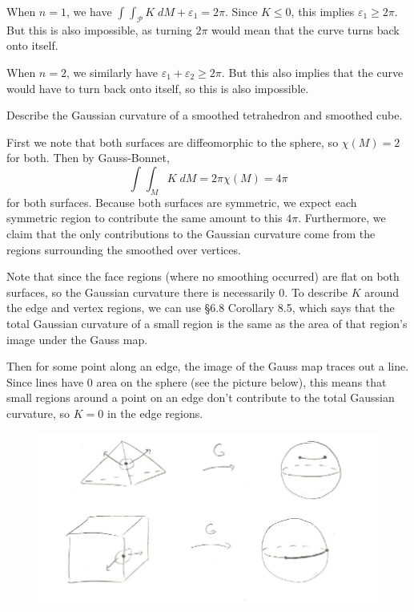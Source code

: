 \documentclass[10pt]{report}
\begin{document}
When $n=1$, we have $\int_{} \int_{\mathscr{P}} K\;dM + \varepsilon_1=2\pi$. Since $K \leq 0$, this implies $\varepsilon_1 \geq 2\pi$. But this is also impossible, as turning $2\pi$ would mean that the curve turns back onto itself.

When $n=2$, we similarly have $\varepsilon_1 + \varepsilon_2 \geq 2\pi$. But this also implies that the curve would have to turn back onto itself, so this is also impossible.

\pagebreak
\begin{exer}[]
Describe the Gaussian curvature of a smoothed tetrahedron and smoothed cube.
\end{exer}
First we note that both surfaces are diffeomorphic to the sphere, so $\chi(M)=2$ for both. Then by Gauss-Bonnet,
\[
	\int_{} \int_{M} K\;dM = 2\pi\chi(M) = 4\pi
\] for both surfaces. Because both surfaces are symmetric, we expect each symmetric region to contribute the same amount to this $4\pi$. Furthermore, we claim that the only contributions to the Gaussian curvature come from the regions surrounding the smoothed over vertices.

Note that since the face regions (where no smoothing occurred) are flat on both surfaces, so the Gaussian curvature there is necessarily 0. To describe $K$ around the edge and vertex regions, we can use \S 6.8 Corollary 8.5, which says that the total Gaussian curvature of a small region is the same as the area of that region's image under the Gauss map.

Then for some point along an edge, the image of the Gauss map traces out a line. Since lines have 0 area on the sphere (see the picture below), this means that small regions around a point on an edge don't contribute to the total Gaussian curvature, so $K=0$ in the edge regions.

\begin{figure}[H]
	\centering
	\includegraphics[scale=0.8]{fig/edge.pdf}
\end{figure}
\end{document}
